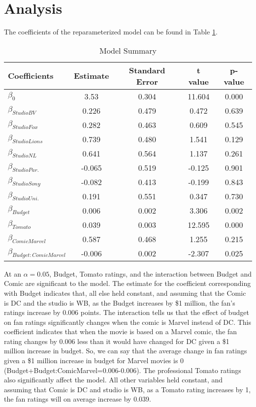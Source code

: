 \documentclass{svproc}
\begin{document}
\section{Analysis}

The coefficients of the reparameterized model can be found in Table \ref{coef}. 

\begin{table}[H]
\begin{center}
\caption{Model Summary}
\begin{tabular}{l | c c c c}
\hline
Coefficients & { Estimate }  & { Standard Error } & { t value } & { p-value } \\
\hline
$\beta_0$   &      3.53 &  0.304 & 11.604 & 0.000 \\
$\beta_{StudioBV}$      &      0.226 &  0.479 &  0.472 &  0.639    \\
$\beta_{StudioFox}$     &      0.282 &  0.463 &  0.609 &  0.545    \\
$\beta_{StudioLions}$   &      0.739 &  0.480 &  1.541 &  0.129   \\
$\beta_{StudioNL}$     &      0.641 &  0.564 &  1.137 &  0.261    \\
$\beta_{StudioPar.}$    &     -0.065 &  0.519 & -0.125 &  0.901    \\
$\beta_{StudioSony}$    &     -0.082 &  0.413 & -0.199 &  0.843    \\
$\beta_{StudioUni.}$    &      0.191 &  0.551 &  0.347 &  0.730    \\
$\beta_{Budget}$       &      0.006 &  0.002 &  3.306 &  0.002 \\
$\beta_{Tomato}$        &      0.039 &  0.003 & 12.595 &  0.000 \\
$\beta_{ComicMarvel}$   &      0.587 &  0.468 &  1.255 &  0.215    \\
$\beta_{Budget:ComicMarvel }$ & -0.006  & 0.002 & -2.307 & 0.025  \\
\hline
\end{tabular}
\label{coef}
\end{center}
\end{table}

At an $\alpha=0.05$, Budget, Tomato ratings, and the interaction between Budget and Comic are significant to the model. The estimate for the coefficient corresponding with Budget indicates that, all else held constant, and assuming that the Comic is DC and the studio is WB, as the Budget increases by \$1 million, the fan's ratings increase by 0.006 points. The interaction tells us that the effect of budget on fan ratings significantly changes when the comic is Marvel instead of DC. This coefficient indicates that when the movie is based on a Marvel comic, the fan rating changes by 0.006 less than it would have changed for DC given a \$1 million increase in budget. So, we can say that the average change in fan ratings given a \$1 million increase in budget for Marvel movies is 0 (Budget+Budget:ComicMarvel=0.006-0.006). The professional Tomato ratings also significantly affect the model. All other variables held constant, and assuming that Comic is DC and studio is WB, as a Tomato rating increases by 1, the fan ratings will on average increase by 0.039. 
\end{document}
